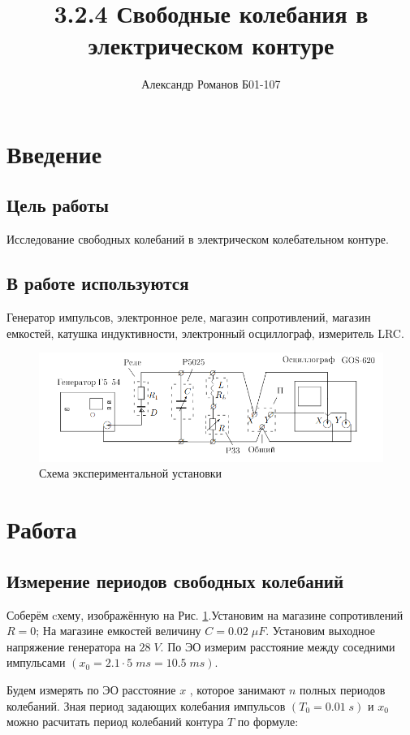 \documentclass{article}
\author{Александр Романов Б01-107}
\date{}
\title{3.2.4 Свободные колебания в электрическом контуре}
\begin{document}
\maketitle
\section{Введение}
\subsection{Цель работы}
Исследование свободных колебаний в электрическом коле­бательном контуре.
\subsection{В работе используются}
Генератор импульсов, электронное реле, магазин сопротивлений, магазин емкостей, катушка индуктивности, электронный осциллограф, измеритель LRC. 
\begin{figure}[H]
    \includegraphics[width=\textwidth]{scheme.png}
    \caption{Схема экспериментальной установки}
    \label{fig:sheme}
\end{figure}

\section{Работа}
\subsection{Измерение периодов свободных колебаний} \label{sec:T}

Соберём cхему, изображённую на Рис. \ref{fig:sheme}.Установим на магазине сопротивлений \(R = 0\); На магазине емкостей
величину \( C = 0.02\; \mu F \). Установим выходное напряжение генератора на \( 28\; V \). По ЭО измерим расстояние между соседними
импульсами \( (x_0 = 2.1 \cdot 5\; ms = 10.5\; ms ) \).

Будем измерять по ЭО расстояние \( x \) , которое занимают \( n \) полных периодов колебаний. Зная период задающих
колебания импульсов \( ( T_0 = 0.01\; s ) \) и \( x_0 \) можно расчитать период колебаний контура \( T \) по формуле:
\end{document}
